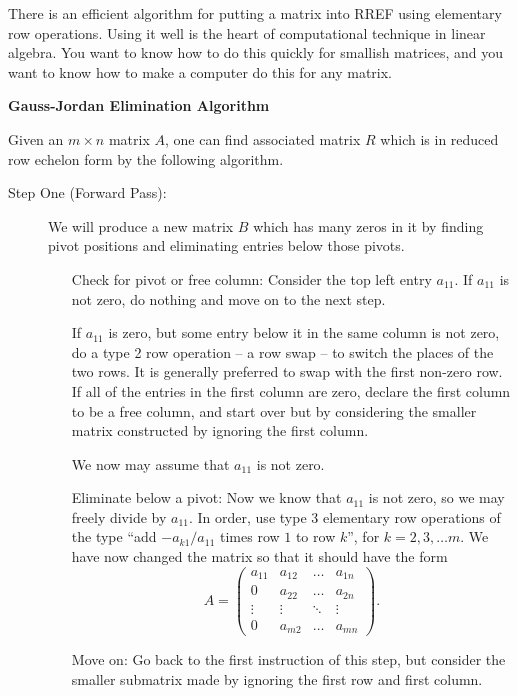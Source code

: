 \documentclass[elementsmain.tex]{subfiles}
\begin{document}
There is an efficient algorithm for putting a matrix into RREF using elementary row operations. Using it well is the heart of computational technique in linear algebra. You want to know how to do this quickly for smallish matrices, and you want to know how to make a computer do this for any matrix.
\begin{center}
\textbf{Gauss-Jordan Elimination Algorithm}
\end{center}
Given an $m\times n$ matrix $A$, one can find associated matrix $R$ which is in reduced row echelon form by the following algorithm.

\begin{description}
\item[Step One (Forward Pass):] We will produce a new matrix $B$ which has many zeros in it by finding pivot positions and eliminating entries below those pivots.
\begin{itemize}
\item[Check for pivot or free column:] Consider the top left entry $a_{11}$. If $a_{11}$ is not zero, do nothing and move on to the next step. 

If $a_{11}$ is zero, but some entry below it in the same column is not zero, do a type 2 row operation -- a row swap -- to switch the places of the two rows. It is generally preferred to swap with the first non-zero row. If all of the entries in the first column are zero, declare the first column to be a free column, and start over but by considering the smaller matrix constructed by ignoring the first column.

We now may assume that $a_{11}$ is not zero.

\item[Eliminate below a pivot:] Now we know that $a_{11}$ is not zero, so we may freely divide by $a_{11}$. In order, use type 3 elementary row operations of the type ``add $- a_{k1}/a_{11}$ times row $1$ to row $k$'', for $k=2,3,\dots m$. We have now changed the matrix so that it should have the form
\begin{equation*}
A = \begin{pmatrix} a_{11} & a_{12} & \dots & a_{1n} \\
0 & a_{22} & \dots & a_{2n} \\
\vdots & \vdots & \ddots & \vdots\\
0 & a_{m2} & \dots & a_{mn}
\end{pmatrix}.
\end{equation*}

\item[Move on:] Go back to the first instruction of this step, but consider the smaller submatrix made by ignoring the first row and first column.


\end{itemize}
\end{description}
\end{document}
